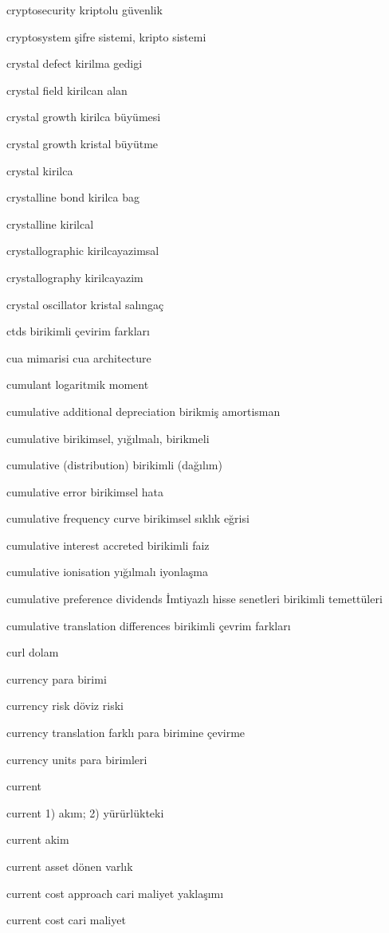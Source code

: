 \documentclass[12pt,fleqn]{article}\usepackage{../../common}
\begin{document}
cryptosecurity kriptolu güvenlik

cryptosystem şifre sistemi, kripto sistemi

crystal defect kirilma gedigi

crystal field kirilcan alan

crystal growth kirilca büyümesi

crystal growth kristal büyütme

crystal kirilca

crystalline bond kirilca bag

crystalline kirilcal

crystallographic kirilcayazimsal

crystallography kirilcayazim

crystal oscillator kristal salıngaç

ctds birikimli çevirim farkları

cua mimarisi cua architecture

cumulant logaritmik moment

cumulative additional depreciation birikmiş amortisman

cumulative birikimsel, yığılmalı, birikmeli

cumulative (distribution) birikimli (dağılım)

cumulative error birikimsel hata

cumulative frequency curve birikimsel sıklık eğrisi

cumulative interest accreted birikimli faiz

cumulative ionisation yığılmalı iyonlaşma

cumulative preference dividends İmtiyazlı hisse senetleri birikimli temettüleri

cumulative translation differences birikimli çevrim farkları

curl dolam

currency para birimi

currency risk döviz riski

currency translation farklı para birimine çevirme

currency units para birimleri

current

current 1) akım; 2) yürürlükteki

current akim

current asset dönen varlık

current cost approach cari maliyet yaklaşımı

current cost cari maliyet
\end{document}
